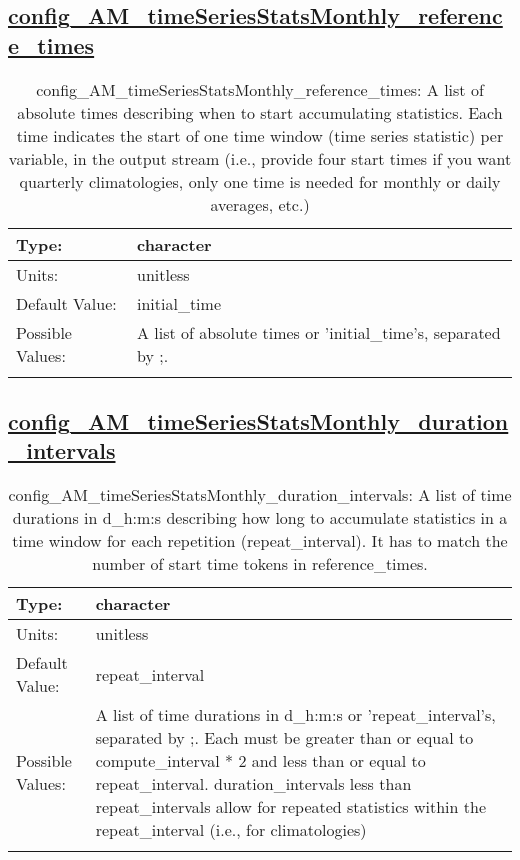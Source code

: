 \subsection[config\_AM\_timeSeriesStatsMonthly\_reference\_times]{\hyperref[sec:nm_tab_AM_timeSeriesStatsMonthly]{config\_AM\_timeSeriesStatsMonthly\_reference\_times}}
\label{subsec:nm_sec_config_AM_timeSeriesStatsMonthly_reference_times}
\begin{center}
\begin{longtable}{| p{2.0in} || p{4.0in} |}
    \hline
    Type: & character \\
    \hline
    Units: & \si{unitless} \\
    \hline
    Default Value: & initial\_time \\
    \hline
    Possible Values: & A list of absolute times or 'initial\_time's, separated by ;. \\
    \hline
    \caption{config\_AM\_timeSeriesStatsMonthly\_reference\_times: A list of absolute times describing when to start accumulating statistics. Each time indicates the start of one time window (time series statistic) per variable, in the output stream (i.e., provide four start times if you want quarterly climatologies, only one time is needed for monthly or daily averages, etc.)}
\end{longtable}
\end{center}
\subsection[config\_AM\_timeSeriesStatsMonthly\_duration\_intervals]{\hyperref[sec:nm_tab_AM_timeSeriesStatsMonthly]{config\_AM\_timeSeriesStatsMonthly\_duration\_intervals}}
\label{subsec:nm_sec_config_AM_timeSeriesStatsMonthly_duration_intervals}
\begin{center}
\begin{longtable}{| p{2.0in} || p{4.0in} |}
    \hline
    Type: & character \\
    \hline
    Units: & \si{unitless} \\
    \hline
    Default Value: & repeat\_interval \\
    \hline
    Possible Values: & A list of time durations in d\_h:m:s or 'repeat\_interval's, separated by ;. Each must be greater than or equal to compute\_interval * 2 and less than or equal to repeat\_interval. duration\_intervals less than repeat\_intervals allow for repeated statistics within the repeat\_interval (i.e., for climatologies) \\
    \hline
    \caption{config\_AM\_timeSeriesStatsMonthly\_duration\_intervals: A list of time durations in d\_h:m:s describing how long to accumulate statistics in a time window for each repetition (repeat\_interval). It has to match the number of start time tokens in reference\_times.}
\end{longtable}
\end{center}
